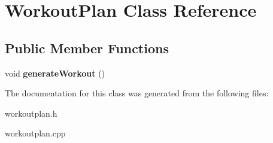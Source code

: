 \hypertarget{class_workout_plan}{\section{Workout\-Plan Class Reference}
\label{class_workout_plan}
}
\subsection*{Public Member Functions}
\begin{DoxyCompactItemize}
\item 
\hypertarget{class_workout_plan_a634f7753ebe7a07a31ef07da04733a7b}{void {\bfseries generate\-Workout} ()}\label{class_workout_plan_a634f7753ebe7a07a31ef07da04733a7b}

\end{DoxyCompactItemize}


The documentation for this class was generated from the following files\-:\begin{DoxyCompactItemize}
\item 
workoutplan.\-h\item 
workoutplan.\-cpp\end{DoxyCompactItemize}
